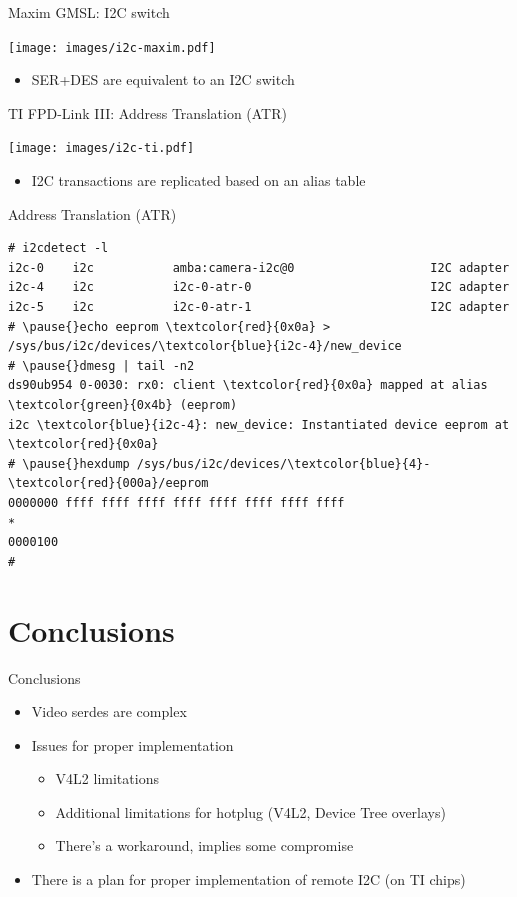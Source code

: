 \documentclass[xetex,table,aspectratio=169]{beamer}
\begin{document}
\begin{frame}{Maxim GMSL: I2C switch}
  \begin{center}
    \texttt{[image: images/i2c-maxim.pdf]}
  \end{center}

  \begin{itemize}
  \item SER+DES are equivalent to an I2C switch
  \end{itemize}
\end{frame}

\begin{frame}{TI FPD-Link III: Address Translation (ATR)}
  \begin{center}
    \texttt{[image: images/i2c-ti.pdf]}
  \end{center}

  \begin{itemize}
  \item I2C transactions are replicated based on an alias table
  \end{itemize}
\end{frame}

\begin{frame}[fragile]{Address Translation (ATR)}
  \begin{Verbatim}[commandchars=\\\{\}]
# i2cdetect -l
i2c-0    i2c           amba:camera-i2c@0                   I2C adapter
i2c-4    i2c           i2c-0-atr-0                         I2C adapter
i2c-5    i2c           i2c-0-atr-1                         I2C adapter
# \pause{}echo eeprom \textcolor{red}{0x0a} > /sys/bus/i2c/devices/\textcolor{blue}{i2c-4}/new_device
# \pause{}dmesg | tail -n2
ds90ub954 0-0030: rx0: client \textcolor{red}{0x0a} mapped at alias \textcolor{green}{0x4b} (eeprom)
i2c \textcolor{blue}{i2c-4}: new_device: Instantiated device eeprom at \textcolor{red}{0x0a}
# \pause{}hexdump /sys/bus/i2c/devices/\textcolor{blue}{4}-\textcolor{red}{000a}/eeprom
0000000 ffff ffff ffff ffff ffff ffff ffff ffff
*
0000100
#
  \end{Verbatim}
\end{frame}


\section{Conclusions}

\begin{frame}{Conclusions}
  \begin{itemize}
  \item Video serdes are complex
  \item Issues for proper implementation
    \begin{itemize}
    \item V4L2 limitations
    \item Additional limitations for hotplug (V4L2, Device Tree overlays)
    \item There's a workaround, implies some compromise
    \end{itemize}
  \item There is a plan for proper implementation of remote I2C (on TI chips)
  \end{itemize}
\end{frame}
\end{document}
